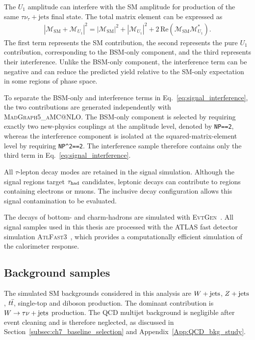 The $U_{1}$ amplitude can interfere with the SM amplitude for production of the same $\tau\nu_{\tau}+\mathrm{jets}$ final state.
The total matrix element can be expressed as
\begin{align}
    \left|\mathcal{M}_{\mathrm{SM}}+\mathcal{M}_{U_1}\right|^{2}
    =
    \left|\mathcal{M}_{\mathrm{SM}}\right|^{2}
    +
    \left|\mathcal{M}_{U_1}\right|^{2}
    +
    2\,\mathrm{Re}
    \left(
        \mathcal{M}_{\mathrm{SM}}
        \mathcal{M}_{U_1}^{*}
    \right).
    \label{eq:signal_interference}
\end{align}
The first term represents the SM contribution, the second represents the pure $U_{1}$ contribution, corresponding to the BSM-only component, and the third represents their interference.
Unlike the BSM-only component, the interference term can be negative and can reduce the predicted yield relative to the SM-only expectation in some regions of phase space.

To separate the BSM-only and interference terms in Eq.~\eqref{eq:signal_interference}, the two contributions are generated independently with \textsc{MadGraph5\_aMC@NLO}.
The BSM-only component is selected by requiring exactly two new-physics couplings at the amplitude level, denoted by \texttt{NP==2}, whereas the interference component is isolated at the squared-matrix-element level by requiring \texttt{NP\^{}2==2}.
The interference sample therefore contains only the third term in Eq.~\eqref{eq:signal_interference}.

All $\tau$-lepton decay modes are retained in the signal simulation.
Although the signal regions target $\tau_{\mathrm{had}}$ candidates, leptonic decays can contribute to regions containing electrons or muons.
The inclusive decay configuration allows this signal contamination to be evaluated.

The decays of bottom- and charm-hadrons are simulated with \textsc{EvtGen}~\cite{Lange2001EvtGen}.
All signal samples used in this thesis are processed with the ATLAS fast detector simulation \textsc{AtlFast3}~\cite{ATLAS2022AtlFast3}, which provides a computationally efficient simulation of the calorimeter response.

\subsection{Background samples}
\label{subsec:background_samples}

The simulated SM backgrounds considered in this analysis are $W+\mathrm{jets}$, $Z+\mathrm{jets}$, $t\bar{t}$, single-top and diboson production.
The dominant contribution is $W\rightarrow\tau\nu+\mathrm{jets}$ production.
The QCD multijet background is negligible after event cleaning and is therefore neglected, as discussed in Section~\ref{subsec:ch7_baseline_selection} and Appendix~\ref{App:QCD_bkg_study}.

